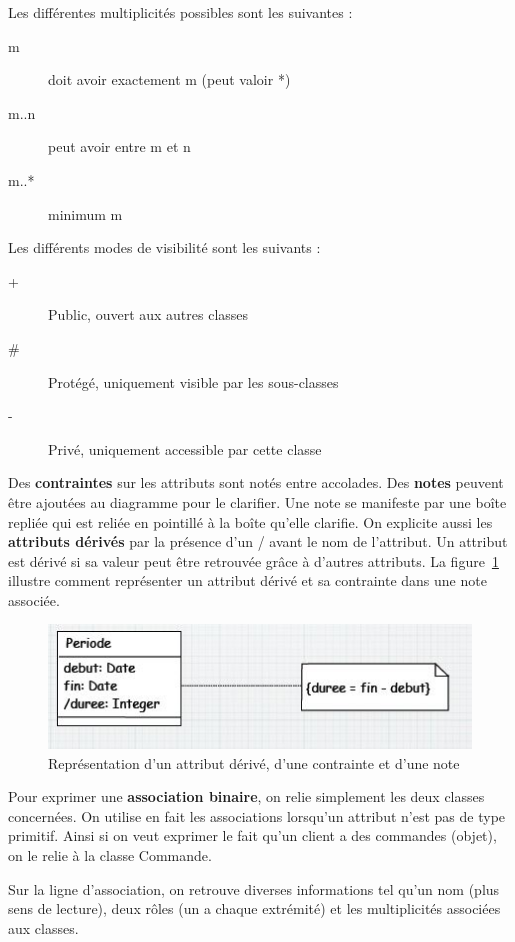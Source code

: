 \hspace*{-.75cm}Les différentes multiplicités possibles sont les suivantes :
\begin{description}
  \item[m] doit avoir exactement m (peut valoir *)
  \item[m..n] peut avoir entre m et n
  \item[m..*] minimum m
\end{description}
Les différents modes de visibilité sont les suivants :
\begin{description}
  \item[+]	Public, ouvert aux autres classes
  \item[\#]	Protégé, uniquement visible par les sous-classes
  \item[-]	Privé, uniquement accessible par cette classe
\end{description}
Des \textbf{contraintes} sur les attributs sont notés entre accolades.
Des \textbf{notes} peuvent être ajoutées au diagramme pour le clarifier.
Une note se manifeste par une boîte repliée qui est
reliée en pointillé à la boîte qu'elle clarifie.
On explicite aussi les \textbf{attributs dérivés} par la présence
d'un / avant le nom de l'attribut.
Un attribut est dérivé si sa valeur peut être retrouvée
grâce à d'autres attributs.
La figure~\ref{diagramme_classes_addon} illustre
comment représenter un attribut dérivé et sa contrainte dans une note associée.
\begin{figure}[h]
  \centering
  \includegraphics[scale=1]{diagramme_classes_addon.jpg}
  \caption{Représentation d'un attribut dérivé, d'une contrainte et d'une note}
  \label{diagramme_classes_addon}
\end{figure}

Pour exprimer une \textbf{association binaire},
on relie simplement les deux classes concernées.
On utilise en fait les associations lorsqu'un attribut n'est pas de type primitif.
Ainsi si on veut exprimer le fait qu'un client a des commandes (objet),
on le relie à la classe Commande.

Sur la ligne d'association,
on retrouve diverses informations tel qu'un nom (plus sens de lecture),
deux rôles (un a chaque extrémité) et les multiplicités associées aux classes.

